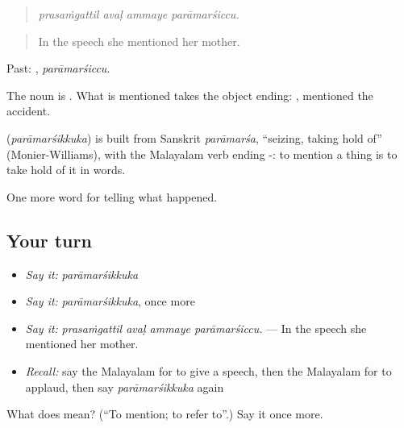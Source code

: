 \begin{quote}
\emph{prasaṁgattil avaḷ ammaye parāmarśiccu.}
\end{quote}

\begin{quote}
In the speech she mentioned her mother.
\end{quote}

Past: , \emph{parāmarśiccu}.

The noun is . What is mentioned takes the object ending:  , mentioned the accident.

\begin{cousinweb}
\textbf{} (\emph{parāmarśikkuka}) is built from Sanskrit \emph{parāmarśa}, \textquotedblleft{}seizing, taking hold of\textquotedblright{} (Monier-Williams), with the Malayalam verb ending -: to mention a thing is to take hold of it in words.
\end{cousinweb}

\begin{grammarlens}[title={What you've built}]
One more word for telling what happened.
\end{grammarlens}

\subsection*{Your turn}
\begin{itemize}
\raggedright
  \item \emph{Say it:} \emph{parāmarśikkuka}
  \item \emph{Say it:} \emph{parāmarśikkuka}, once more
  \item \emph{Say it:} \emph{prasaṁgattil avaḷ ammaye parāmarśiccu.} — In the speech she mentioned her mother.
  \item \emph{Recall:} say the Malayalam for to give a speech, then the Malayalam for to applaud, then say \emph{parāmarśikkuka} again
\end{itemize}

\begin{tcolorbox}[breakable,colback=teal!4,colframe=teal!35!black,title={Before you move on}]
What does  mean? (\textquotedblleft{}To mention; to refer to\textquotedblright{}.) Say it once more.
\end{tcolorbox}
